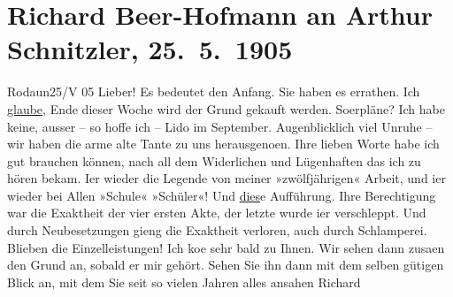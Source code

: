 

         
         \renewcommand{\erwaehntePersonen}{Personen: Agnes Beer}
         \renewcommand{\erwaehnteOrte}{Orte: Lido, Rodaun, Wien}
         \renewcommand{\erwaehnteWerke}{Werke: Der Graf von Charolais. Ein Trauerspiel}
               \section[Richard Beer-Hofmann an Arthur Schnitzler, 25. 5. 1905]{ Richard Beer-Hofmann an Arthur Schnitzler, 25. 5. 1905}\nopagebreak{}\rehead{ }\begin{ledgroupsized}[t]{13cm}\normalsize\beginnumbering \toendnotes[C]{\smallbreak\pagebreak[2]} 
\toendnotes[C]{\smallbreak}\pstart
           \raggedleft{}{\pb}Rodaun25/V 05\pend
           \pstart
           Lieber! Es bedeutet den Anfang. Sie haben es errathen. Ich \uline{glaube}, Ende dieser Woche wird der Grund gekauft
               werden. So{\geminationm}erpläne? Ich habe keine, ausser – so hoffe
               ich – Lido im September.
               Augenblicklich viel Unruhe – wir haben die arme alte Tante zu uns herausgeno{\geminationm}en.\pend
           \pstart
           Ihre lieben Worte habe ich gut brauchen können, nach all dem Widerlichen und
               Lügenhaften das ich zu hören bekam. I{\geminationm}er wieder die
               Legende von meiner »zwölf{\pb}jährigen«
               Arbeit, und i{\geminationm}er wieder bei Allen »Schule« »Schüler«!
               Und \uline{dies}e Aufführung. Ihre Berechtigung war die Exaktheit der vier
               ersten Akte, der letzte wurde i{\geminationm}er verschleppt. Und
               durch Neubesetzungen gieng die Exaktheit verloren, auch durch Schlamperei. Blieben
               die Einzelleistungen!\pend
           \pstart
           Ich ko{\geminationm}e sehr bald zu Ihnen. Wir sehen dann zusa{\geminationm}en den Grund an, sobald er mir gehört. Sehen Sie ihn
               dann mit dem selben gütigen Blick an, mit dem Sie seit so vielen Jahren alles ansahen
                  \label{T_L01519-1v}\label{T_L01519-1h}\spacefill\mbox{Richard}\pend
           

\end{ledgroupsized}
